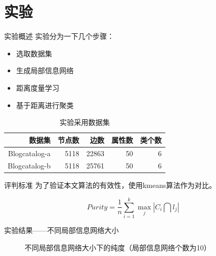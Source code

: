 \documentclass[14pt]{beamer}
\begin{document}
\section{实验}

\begin{frame}{实验概述}
实验分为一下几个步骤：
\begin{itemize}
\item 选取数据集
\item 生成局部信息网络
\item 距离度量学习
\item 基于距离进行聚类
\end{itemize}

\begin{table}[!hpb]
\centering
\caption{实验采用数据集}
    \begin{tabular}{rrrrr} \toprule
    数据集 & 节点数 & 边数  & 属性数 & 类个数\\ \midrule
    Blogcatalog-a & 5118 & 22863 & 50 & 6 \\
    Blogcatalog-b & 5118 & 25761  & 50 & 6 \\ \bottomrule
    \end{tabular}
\end{table}
\end{frame}

\begin{frame}{评判标准}
为了验证本文算法的有效性，使用kmeans算法作为对比。\pause

\[
Purity = \frac{1}{n} \sum_{i=1}^k \operatorname*{max}_j |C_i \bigcap l_j|
\]
\end{frame}

\begin{frame}{实验结果——不同局部信息网络大小}
\begin{figure}
  \centering
\caption{不同局部信息网络大小下的纯度（局部信息网络个数为10）}
\end{figure}
\end{frame}
\end{document}
